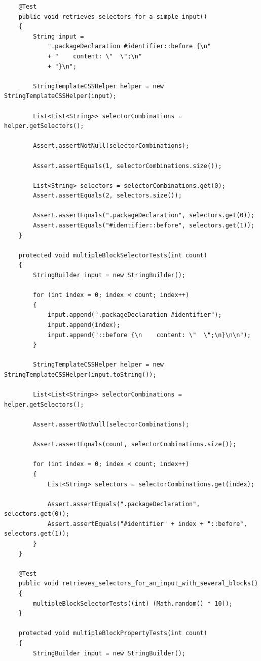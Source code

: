 \documentclass[11pt]{article}
\begin{document}
\begin{verbatim}
    @Test
    public void retrieves_selectors_for_a_simple_input()
    {
        String input =
            ".packageDeclaration #identifier::before {\n"
            + "    content: \"  \";\n"
            + "}\n";

        StringTemplateCSSHelper helper = new StringTemplateCSSHelper(input);

        List<List<String>> selectorCombinations = helper.getSelectors();

        Assert.assertNotNull(selectorCombinations);

        Assert.assertEquals(1, selectorCombinations.size());

        List<String> selectors = selectorCombinations.get(0);
        Assert.assertEquals(2, selectors.size());

        Assert.assertEquals(".packageDeclaration", selectors.get(0));
        Assert.assertEquals("#identifier::before", selectors.get(1));
    }

    protected void multipleBlockSelectorTests(int count)
    {
        StringBuilder input = new StringBuilder();

        for (int index = 0; index < count; index++)
        {
            input.append(".packageDeclaration #identifier");
            input.append(index);
            input.append("::before {\n    content: \"  \";\n}\n\n");
        }

        StringTemplateCSSHelper helper = new StringTemplateCSSHelper(input.toString());

        List<List<String>> selectorCombinations = helper.getSelectors();

        Assert.assertNotNull(selectorCombinations);

        Assert.assertEquals(count, selectorCombinations.size());

        for (int index = 0; index < count; index++)
        {
            List<String> selectors = selectorCombinations.get(index);

            Assert.assertEquals(".packageDeclaration", selectors.get(0));
            Assert.assertEquals("#identifier" + index + "::before", selectors.get(1));
        }
    }

    @Test
    public void retrieves_selectors_for_an_input_with_several_blocks()
    {
        multipleBlockSelectorTests((int) (Math.random() * 10));
    }

    protected void multipleBlockPropertyTests(int count)
    {
        StringBuilder input = new StringBuilder();


\end{verbatim}
\end{document}
